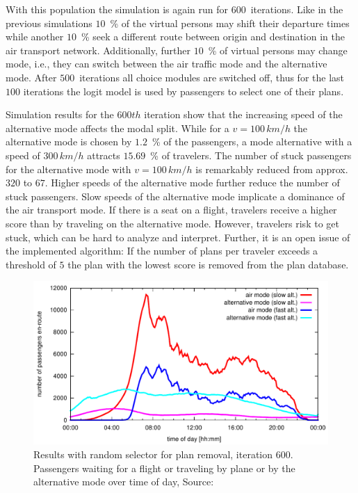 With this population the simulation is again run for $600$~iterations. 
Like in the previous simulations $10$~\% of the virtual persons may shift their departure times while another $10$~\% seek a different route between origin and destination in the air transport network. 
Additionally, further $10$~\% of virtual persons may change mode, i.e., they can switch between the air traffic mode and the alternative mode. 
After $500$~iterations all choice modules are switched off, thus for the last $100$ iterations the logit model is used by passengers to select one of their plans. 

Simulation results for the $600th$ iteration show that the 
increasing speed of the alternative mode affects the modal split. %
While for a $v = 100 \, km/h$ the alternative mode is chosen by $1.2$~\% of the passengers, a mode alternative with a speed of $300 \, km/h$ attracts $15.69$~\% of travelers. 
The number of stuck passengers for the alternative mode with $v = 100 \, km/h$ is remarkably reduced from approx.~$320$ to $67$. 
Higher speeds of the alternative mode further reduce the number of stuck passengers. 
Slow speeds of the alternative mode implicate a dominance of the air transport mode. 
If there is a seat on a flight, travelers receive a higher score than by traveling on the alternative mode. 
However, travelers risk to get stuck, which can be hard to analyze and interpret. 
Further, it is an open issue of the implemented algorithm: If the number of plans per traveler exceeds a threshold of $5$ the plan with the lowest score is removed from the plan database. 

\begin{figure}[t]
	\centering
	\includegraphics[width=\linewidth]{./extending/figures/air/leg_histogram_improved_flight_train_en_route_1893_1897_it_600.pdf}
	\caption{Results with random selector for plan removal, iteration 600. Passengers waiting for a flight or traveling by plane or by the alternative mode over time of day, Source:~\citet{Grether2014PhD}}
	\label{fig:2009_leg_histogram_modes_psl}
\end{figure}


